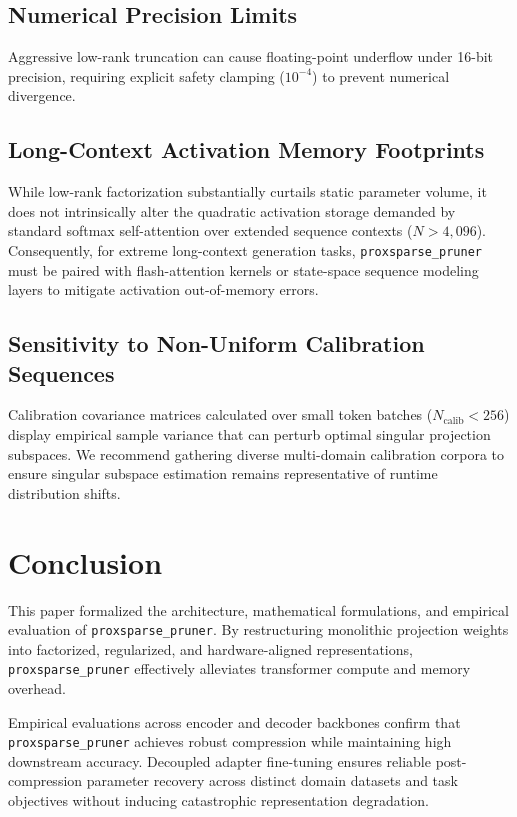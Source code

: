\subsection{Numerical Precision Limits}
Aggressive low-rank truncation can cause floating-point underflow under 16-bit precision, requiring explicit safety clamping ($10^{-4}$) to prevent numerical divergence.

\subsection{Long-Context Activation Memory Footprints}
While low-rank factorization substantially curtails static parameter volume, it does not intrinsically alter the quadratic activation storage demanded by standard softmax self-attention over extended sequence contexts ($N > 4{,}096$). Consequently, for extreme long-context generation tasks, \texttt{proxsparse\_pruner} must be paired with flash-attention kernels or state-space sequence modeling layers to mitigate activation out-of-memory errors.

\subsection{Sensitivity to Non-Uniform Calibration Sequences}
Calibration covariance matrices calculated over small token batches ($N_{\text{calib}} < 256$) display empirical sample variance that can perturb optimal singular projection subspaces. We recommend gathering diverse multi-domain calibration corpora to ensure singular subspace estimation remains representative of runtime distribution shifts.


\section{Conclusion}
This paper formalized the architecture, mathematical formulations, and empirical evaluation of \texttt{proxsparse\_pruner}. By restructuring monolithic projection weights into factorized, regularized, and hardware-aligned representations, \texttt{proxsparse\_pruner} effectively alleviates transformer compute and memory overhead.

Empirical evaluations across encoder and decoder backbones confirm that \texttt{proxsparse\_pruner} achieves robust compression while maintaining high downstream accuracy. Decoupled adapter fine-tuning ensures reliable post-compression parameter recovery across distinct domain datasets and task objectives without inducing catastrophic representation degradation.

